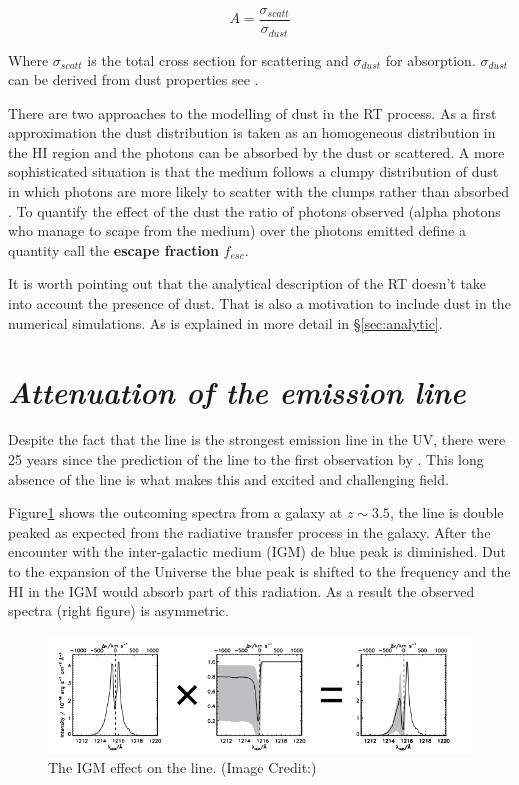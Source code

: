 \begin{equation}
A = \dfrac{\sigma_{scatt}}{\sigma_{dust}}
\end{equation}

Where $\sigma_{scatt}$ is the total cross section for scattering 
and $\sigma_{dust}$ for absorption. $\sigma_{dust}$ can be derived from 
dust properties see \citep{Laursen09}. 

There are two approaches to the modelling of dust in the \ly RT process.
As a first approximation the dust distribution is taken as an homogeneous distribution 
in the HI region and 
the \ly photons can be absorbed by the dust or scattered. A more
sophisticated situation is that the medium follows a clumpy distribution
of dust in which \ly photons are more likely to scatter with the 
clumps rather than absorbed \citep{Laursen13}. To quantify the effect of 
the dust the ratio
of \ly photons observed (\ly alpha photons who manage to scape from the medium) 
over the \ly photons emitted define a quantity call the {\bf{escape fraction}} $f_{esc}$. 

It is worth pointing out that the analytical
description of the \ly RT doesn't take into account the presence of
dust. That is also a motivation to include dust in the numerical simulations.
As is explained in more detail in \S \ref{sec:analytic}.  





\section{\emph{Attenuation of the \ly emission line}}

Despite the fact that the \ly line is the strongest emission line in 
the UV, there were 25 years since the prediction of the \ly line to 
the first observation by \citep{DjorgovskiThomson92}. 
This long absence of the \ly line is what makes this and excited and 
challenging field.

Figure\ref{fig:IGM} shows the outcoming spectra from a galaxy 
at $z \sim 3.5$, the line is double peaked as expected from 
the radiative transfer process in the galaxy. After the encounter
with the inter-galactic medium (IGM) de blue peak is diminished.
Dut to the expansion of the Universe the blue peak 
is shifted to the \ly frequency and the HI in the IGM would absorb
part of this radiation. As a result the observed spectra (right figure)
is asymmetric.   

\begin{figure}[H]
\begin{center}
\includegraphics[scale=0.6]{../Figures/ISM.png}
\end{center}\caption{The IGM effect on the \ly line. (Image Credit:)\label{fig:IGM}}
\end{figure}


